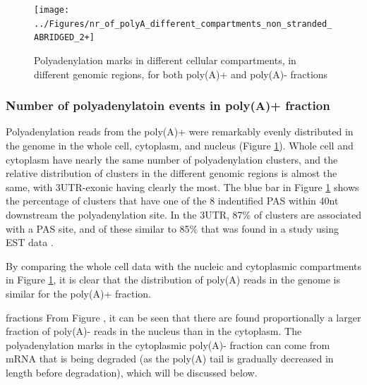\documentclass[a4paper]{article}
\begin{document}
\begin{figure}[h]
	\centering
		\texttt{[image: ../Figures/nr\_of\_polyA\_different\_compartments\_non\_stranded\_ABRIDGED\_2+]}
	\caption{Polyadenylation marks in different cellular compartments, in
	different genomic regions, for both poly(A)+ and poly(A)- fractions}
	\label{fig:region_counts}
\end{figure}
\subsubsection{Number of polyadenylatoin events in poly(A)+ fraction}
Polyadenylation reads from the poly(A)+ were remarkably evenly distributed in
the genome in the whole cell, cytoplasm, and nucleus (Figure
\ref{fig:region_counts}). Whole cell and cytoplasm have nearly the same number
of polyadenylation clusters, and the relative distribution of clusters in the
different genomic regions is almost the same, with 3UTR-exonic having clearly
the most. The blue bar in Figure \ref{fig:region_counts} shows the percentage
of clusters that have one of the 8 indentified PAS \cite{} within 40nt downstream the
polyadenylation site. In the 3UTR, 87\% of clusters are associated with a PAS
site, and of these similar to 85\% that was found in a study using EST data \cite{}.

By comparing the whole cell data with the  nucleic
and cytoplasmic compartments in Figure \ref{fig:region_counts}, it is clear
that the distribution of poly(A) reads in the genome is similar for the
poly(A)+ fraction.


fractions From Figure , it can be seen that there are found
proportionally a larger fraction of poly(A)- reads in the nucleus than in the
cytoplasm. The polyadenylation marks in the cytoplasmic poly(A)- fraction can
come from mRNA that is being degraded (as the poly(A) tail is gradually
decreased in length before degradation), which will be discussed below.
\end{document}
